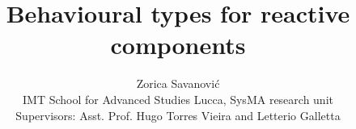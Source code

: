 \documentclass[12pt]{spieman}
\title{Behavioural types for reactive components}
\author{Zorica Savanovi\'c\\
IMT School for Advanced Studies Lucca, SysMA research unit\\ Supervisors: Asst. Prof. Hugo Torres Vieira and Letterio Galletta}
\begin{document}
\maketitle

\begin{spacing}{1.5}








\end{spacing}
\end{document}
